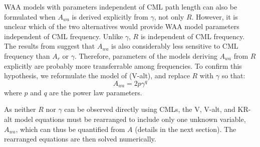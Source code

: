 \documentclass{ctuthesis}\usepackage[]{graphicx}\usepackage[]{color}
\begin{document}
WAA models with parameters independent of CML path length can also be formulated when $A_{wa}$ is derived explicitly from $\gamma$, not only $R$. However, it is unclear which of the two alternatives would provide WAA model parameters independent of CML frequency. Unlike $\gamma$, $R$ is independent of CML frequency. The results from \cite{leijnseMicrowaveLinkRainfall2008} suggest that $A_{wa}$ is also considerably less sensitive to CML frequency than $A_r$ or $\gamma$. Therefore, parameters of the models deriving $A_{wa}$ from $R$ explicitly are probably more transferrable among frequencies. To confirm this hypothesis, we reformulate the model of \cite{valtrExcessAttenuationCaused2019} (V-alt), and replace $R$ with $\gamma$ so that: 
        \begin{equation} \label{eq:II_3}
        A_{wa} = 2 p \gamma^q
        \end{equation}
where $p$ and $q$ are the power law parameters. 

As neither $R$ nor $\gamma$ can be observed directly using CMLs, the V, V-alt, and KR-alt model equations must be rearranged to include only one unknown variable, $A_{wa}$, which can thus be quantified from $A$ (details in the next section). The rearranged equations are then solved numerically.
\end{document}
